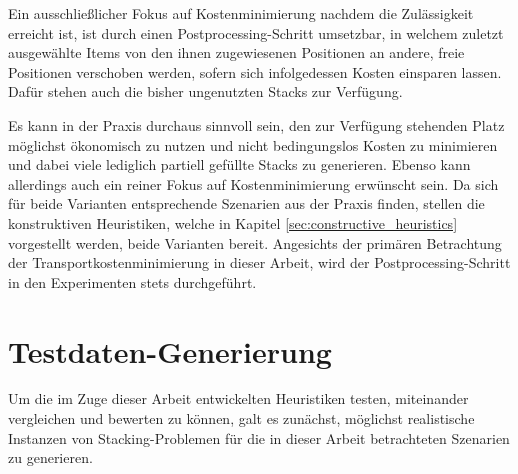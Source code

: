 Ein ausschließlicher Fokus auf Kostenminimierung nachdem die Zulässigkeit erreicht ist, ist durch
einen Postprocessing-Schritt umsetzbar, in welchem zuletzt ausgewählte Items von den ihnen zugewiesenen Positionen
an andere, freie Positionen verschoben werden, sofern sich infolgedessen Kosten einsparen lassen.
Dafür stehen auch die bisher ungenutzten Stacks zur Verfügung.

Es kann in der Praxis durchaus sinnvoll sein, den zur Verfügung stehenden Platz möglichst ökonomisch zu nutzen
und nicht bedingungslos Kosten zu minimieren und dabei viele lediglich partiell gefüllte Stacks zu generieren.
Ebenso kann allerdings auch ein reiner Fokus auf Kostenminimierung erwünscht sein. Da sich für beide Varianten
entsprechende Szenarien aus der Praxis finden, stellen die konstruktiven Heuristiken,
welche in Kapitel \ref{sec:constructive_heuristics} vorgestellt werden, beide Varianten bereit.
Angesichts der primären Betrachtung der Transportkostenminimierung in dieser Arbeit,
wird der Postprocessing-Schritt in den Experimenten stets durchgeführt.

\section{Testdaten-Generierung}
\label{sec:test_data}

Um die im Zuge dieser Arbeit entwickelten Heuristiken testen, miteinander vergleichen
und bewerten zu können, galt es zunächst, möglichst realistische Instanzen von Stacking-Problemen
für die in dieser Arbeit betrachteten Szenarien zu generieren.

